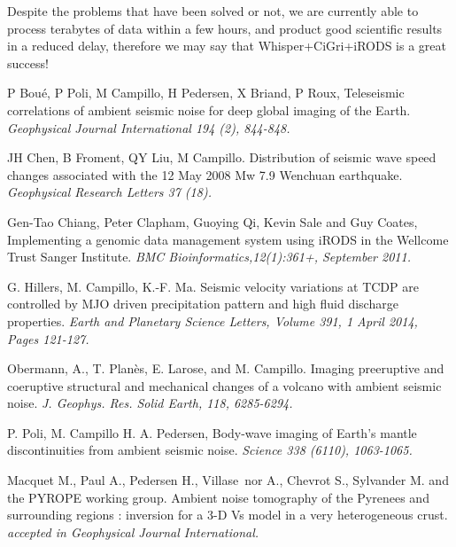 \documentclass[a4paper, 10pt]{article}
\begin{document}
\begin{multicols}{2}
Despite the problems that have been solved or not, we are currently able to process terabytes of data within a few hours, and product good scientific results in a reduced delay, therefore we may say that Whisper+CiGri+iRODS is a great success!

\begin{thebibliography}{9}

P Bou\'e, P Poli, M Campillo, H Pedersen, X Briand, P Roux,
Teleseismic correlations of ambient seismic noise for deep global imaging of the Earth.
{\em Geophysical Journal International 194 (2), 844-848.}

JH Chen, B Froment, QY Liu, M Campillo.
Distribution of seismic wave speed changes associated with the 12 May 2008 Mw 7.9 Wenchuan earthquake.
{\em Geophysical Research Letters 37 (18).}

 Gen-Tao Chiang, Peter Clapham, Guoying Qi, Kevin Sale and Guy Coates,
 Implementing a genomic data management system using iRODS in the Wellcome Trust Sanger Institute.
{\em BMC Bioinformatics,12(1):361+, September 2011.}

G. Hillers, M. Campillo, K.-F. Ma.
Seismic velocity variations at TCDP are controlled by MJO driven precipitation pattern and high fluid discharge properties.
{\em Earth and Planetary Science Letters, Volume 391, 1 April 2014, Pages 121-127.}

Obermann, A., T. Plan\`es, E. Larose, and M. Campillo.
Imaging preeruptive and coeruptive structural and mechanical changes of a volcano with ambient seismic noise.
{\em J. Geophys. Res. Solid Earth, 118, 6285-6294. }

P. Poli, M. Campillo H. A. Pedersen,
Body-wave imaging of Earth's mantle discontinuities from ambient seismic noise.
{\em Science 338 (6110), 1063-1065.}

Macquet M., Paul A., Pedersen H., Villase~nor A., Chevrot S., Sylvander M. and the PYROPE working group.
Ambient noise tomography of the Pyrenees and surrounding regions : inversion for a 3-D Vs model in a very heterogeneous crust.
{\em accepted in Geophysical Journal International.}

\end{thebibliography}

\end{multicols}
\end{document}
